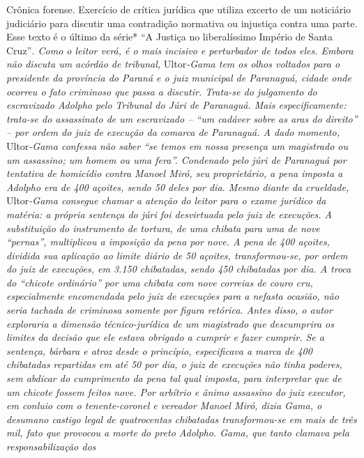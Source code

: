\begin{didascalia}
Crônica forense. Exercício de crítica jurídica que utiliza excerto de um
noticiário judiciário para discutir uma contradição normativa ou
injustiça contra uma parte. Esse texto é o último da série* ``A Justiça
no liberalíssimo Império de Santa Cruz''\emph{. Como o leitor verá, é o
mais incisivo e perturbador de todos eles. Embora não discuta um acórdão
de tribunal,} Ultor\emph{-Gama tem os olhos voltados para o presidente
da província do Paraná e o juiz municipal de Paranaguá, cidade onde
ocorreu o fato criminoso que passa a discutir. Trata-se do julgamento do
escravizado Adolpho pelo Tribunal do Júri de Paranaguá. Mais
especificamente: trata-se do assassinato de um escravizado -- ``um
cadáver sobre as aras do direito'' -- por ordem do juiz de execução da
comarca de Paranaguá. A dado momento,} Ultor\emph{-Gama confessa não
saber ``se temos em nossa presença um magistrado ou um assassino; um
homem ou uma fera''. Condenado pelo júri de Paranaguá por tentativa de
homicídio contra Manoel Miró, seu proprietário, a pena imposta a Adolpho
era de 400 açoites, sendo 50 deles por dia. Mesmo diante da crueldade,}
Ultor\emph{-Gama consegue chamar a atenção do leitor para o exame
jurídico da matéria: a própria sentença do júri foi desvirtuada pelo
juiz de execuções. A substituição do instrumento de tortura, de uma
chibata para uma de nove ``pernas'', multiplicou a imposição da pena por
nove. A pena de 400 açoites, dividida sua aplicação ao limite diário de
50 açoites, transformou-se, por ordem do juiz de execuções, em 3.150
chibatadas, sendo 450 chibatadas por dia. A troca do ``chicote ordinário''
por uma chibata com nove correias de couro cru, especialmente
encomendada pelo juiz de execuções para a nefasta ocasião, não seria
tachada de criminosa somente por figura retórica. Antes disso, o autor
exploraria a dimensão técnico-jurídica de um magistrado que descumprira
os limites da decisão que ele estava obrigado a cumprir e fazer cumprir.
Se a sentença, bárbara e atroz desde o princípio, especificava a marca
de 400 chibatadas repartidas em até 50 por dia, o juiz de execuções não
tinha poderes, sem abdicar do cumprimento da pena tal qual imposta, para
interpretar que de um chicote fossem feitos nove. Por arbítrio e ânimo
assassino do juiz executor, em conluio com o tenente-coronel e vereador
Manoel Miró, dizia Gama, o desumano castigo legal de quatrocentas
chibatadas transformou-se em mais de três mil, fato que provocou a morte
do preto Adolpho. Gama, que tanto clamava pela responsabilização dos
}
\end{didascalia}
